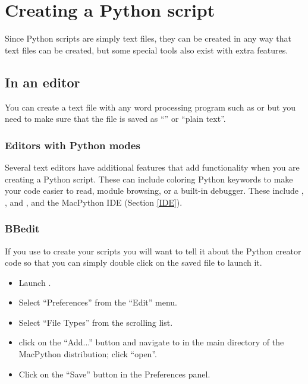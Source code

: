 \section{Creating a Python script}

Since Python scripts are simply text files, they can be created in any
way that text files can be created, but some special tools also exist
with extra features.


\subsection{In an editor}

You can create a text file with any word processing program such as
 or  but you need to make sure
that the file is saved as ``\ASCII'' or ``plain text''.


\subsubsection{Editors with Python modes}

Several text editors have additional features that add functionality
when you are creating a Python script.  These can include coloring
Python keywords to make your code easier to read, module browsing, or
a built-in debugger. These include , ,
and , and the MacPython IDE (Section \ref{IDE}).

 
\subsubsection{BBedit \label{scripting-with-BBedit}}

If you use  to create your scripts you will want to tell it about the Python creator code so that
you can simply double click on the saved file to launch it.
\begin{itemize}
  \item Launch .
  \item Select ``Preferences'' from the ``Edit'' menu.
  \item Select ``File Types'' from the scrolling list.
  \item click on the ``Add...'' button and navigate to
         in the main directory of the
        MacPython distribution; click ``open''.
  \item Click on the ``Save'' button in the Preferences panel.
\end{itemize}
 
